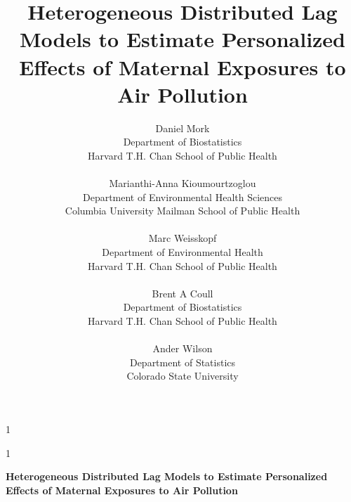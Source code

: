 \documentclass[12pt]{article}
\newcommand{\blind}{1}
\begin{document}
%

\def\spacingset#1{\renewcommand{\baselinestretch}%
{#1}\small\normalsize} \spacingset{1}



\blind
{
  \title{\bf Heterogeneous Distributed Lag Models to Estimate Personalized Effects of Maternal Exposures to Air Pollution}
  \author{Daniel Mork\\
Department of Biostatistics\\ 
Harvard T.H. Chan School of Public Health\\\\
Marianthi-Anna Kioumourtzoglou\\
Department of Environmental Health Sciences\\
Columbia University Mailman School of Public Health\\\\
Marc Weisskopf\\
Department of Environmental Health\\ 
Harvard T.H. Chan School of Public Health\\\\ 
Brent A Coull\\
Department of Biostatistics\\
Harvard T.H. Chan School of Public Health\\\\ 
Ander Wilson\\ 
Department of Statistics\\ Colorado State University}
  \maketitle
\clearpage
} \fi

\blind
{
  \bigskip
  \bigskip
  \bigskip
  \begin{center}
    {\LARGE\bf Heterogeneous Distributed Lag Models to Estimate Personalized Effects of Maternal Exposures to Air Pollution}
\end{center}
  \medskip
} \fi
\end{document}
